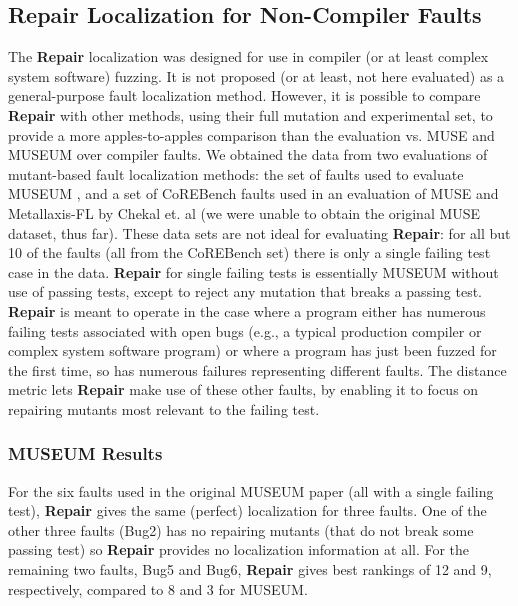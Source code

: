 \subsection{Repair Localization for Non-Compiler Faults}
\label{sec:otherfaults}

The {\bf Repair} localization was designed for use in compiler (or at least complex system software) fuzzing.  It is not proposed (or at least, not here evaluated) as a general-purpose fault localization method.  However, it is possible to compare {\bf Repair} with other methods, using their full mutation and experimental set, to provide a more apples-to-apples comparison than the evaluation vs. MUSE and MUSEUM over compiler faults.  We obtained the data from two evaluations of mutant-based fault localization methods:  the set of faults used to evaluate MUSEUM \cite{multilingual}, and a set of CoREBench \cite{CoREBench} faults used in an evaluation of MUSE and Metallaxis-FL by Chekal et. al \cite{Papadakis} (we were unable to obtain the original MUSE dataset, thus far).  These data sets are not ideal for evaluating {\bf Repair}: for all but 10 of the faults (all from the CoREBench set) there is only a single failing test case in the data.  {\bf Repair} for single failing tests is essentially MUSEUM without use of passing tests, except to reject any mutation that breaks a passing test.  {\bf Repair} is meant to operate in the case where a program either has numerous failing tests associated with open bugs (e.g., a typical production compiler or complex system software program) or where a program has just been fuzzed for the first time, so has numerous failures representing different faults.  The distance metric lets {\bf Repair} make use of these other faults, by enabling it to focus on repairing mutants most relevant to the failing test.

\subsubsection{MUSEUM Results}  For the six faults used in the original MUSEUM paper (all with a single failing test), {\bf Repair} gives the same (perfect) localization for three faults.  One of the other three faults (Bug2) has no repairing mutants (that do not break some passing test) so {\bf Repair} provides no localization information at all.  For the remaining two faults, Bug5 and Bug6, {\bf Repair} gives best rankings of 12 and 9, respectively, compared to 8 and 3 for MUSEUM.


